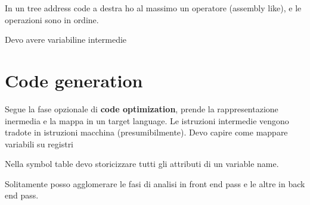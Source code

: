 In un tree address code a destra ho al massimo un operatore (assembly like), e le operazioni sono in ordine.

Devo avere variabiline intermedie
\section{Code generation}
Segue la fase opzionale di \textbf{code optimization}, prende la rappresentazione inermedia e la mappa in un target language.
Le istruzioni intermedie vengono tradote in istruzioni macchina (presumibilmente). Devo capire come mappare variabili su registri

Nella symbol table devo storicizzare tutti gli attributi di un variable name.
 
Solitamente posso agglomerare le fasi di analisi in front end pass e le altre in back end pass.






